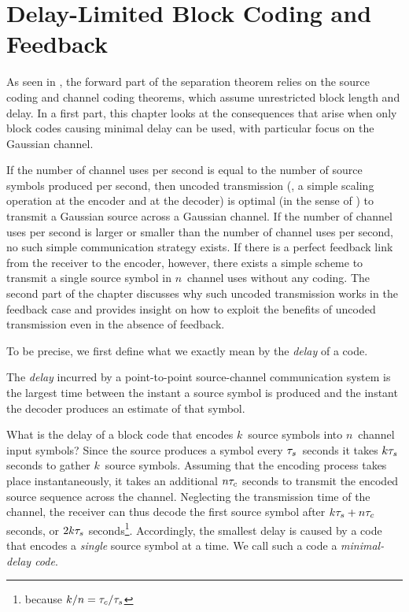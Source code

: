 \chapter{Delay-Limited Block Coding and Feedback}
\label{ch:delaygauss}

As seen in , the forward part of the separation theorem
relies on the source coding and channel coding theorems, which assume
unrestricted block length and delay. In a first part, this chapter looks at the
consequences that arise when only block codes causing minimal delay can be used,
with particular focus on the Gaussian channel. 

If the number of channel uses per second is equal to the number of source
symbols produced per second, then uncoded transmission (\ie, a simple scaling
operation at the encoder and at the decoder) is optimal (in the sense of
) to transmit a Gaussian source across a Gaussian channel. If
the number of channel uses per second is larger or smaller than the number of
channel uses per second, no such simple communication strategy exists. If there
is a perfect feedback link from the receiver to the encoder, however, there
exists a simple scheme to transmit a single source symbol in $n$~channel uses
without any coding. The second part of the chapter discusses why such uncoded
transmission works in the feedback case and provides insight on how to exploit
the benefits of uncoded transmission even in the absence of feedback.

To be precise, we first define what we exactly mean by the \emph{delay} of a
code.

\begin{definition}
  \label{def:delay}
  The \emph{delay} incurred by a point-to-point source-channel communication
  system is the largest time between the instant a source symbol is produced and
  the instant the decoder produces an estimate of that symbol. 
\end{definition}

What is the delay of a block code that encodes $k$~source symbols into
$n$~channel input symbols? Since the source produces a symbol every
${\tau_s}$~seconds it takes $k{\tau_s}$ seconds to gather $k$~source symbols. Assuming
that the encoding process takes place instantaneously, it takes an additional
$n{\tau_c}$ seconds to transmit the encoded source sequence across the channel.
Neglecting the transmission time of the channel, the receiver can thus decode
the first source symbol after $k{\tau_s} + n {\tau_c}$ seconds, or $2k{\tau_s}$
seconds\footnote{because $k/n = {\tau_c}/{\tau_s}$}.  Accordingly, the smallest delay is
caused by a code that encodes a \emph{single} source symbol at a time. We call
such a code a \emph{minimal-delay code}.

